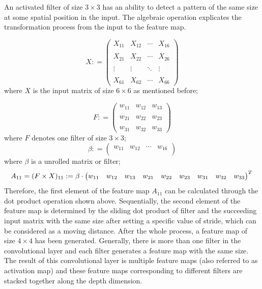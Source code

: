 \documentclass[]{krantz}
\begin{document}
An activated filter of size \(3 \times 3\) has an ability to detect a pattern of the same size at some spatial position in the input. The algebraic operation explicates the transformation process from the input to the feature map.

\[ X  : = \begin{pmatrix}
X_{11} & X_{12} & \cdots & X_{16}\\ \\
X_{21} & X_{22} & \cdots &X_{26} \\ \\
\vdots & \vdots & \ddots & \vdots \\ \\
X_{61} & X_{62} & \cdots & X_{66}
\end{pmatrix}\]
where \(X\) is the input matrix of size \(6 \times 6\) as mentioned before;

\[ F  : = \begin{pmatrix}
w_{11} & w_{12}  & w_{13}\\ \\
w_{21} & w_{22}  & w_{23} \\ \\
w_{31} & w_{32}  & w_{33}
\end{pmatrix}\]
where \(F\) denotes one filter of size \(3 \times 3\);
\[ \beta  : = \begin{pmatrix}
w_{11} & w_{12} & \cdots & w_{16}\\
\end{pmatrix}\]
where \(\beta\) is a unrolled matrix or filter;
\[ A_{11} = (F \times X)_{11}  : =
\beta \cdot \begin{pmatrix}
w_{11} & w_{12} & w_{13} & w_{21} & w_{22} & w_{23} & w_{31} & w_{32} & w_{33}\\
\end{pmatrix}^{T}\\\]
Therefore, the first element of the feature map \(A_{11}\) can be calculated through the dot product operation shown above. Sequentially, the second element of the feature map is determined by the sliding dot product of filter and the succeeding input matrix with the same size after setting a specific value of stride, which can be considered as a moving distance. After the whole process, a feature map of size \(4 \times 4\) has been generated. Generally, there is more than one filter in the convolutional layer and each filter generates a feature map with the same size. The result of this convolutional layer is multiple feature maps (also referred to as activation map) and these feature maps corresponding to different filters are stacked together along the depth dimension.
\end{document}
